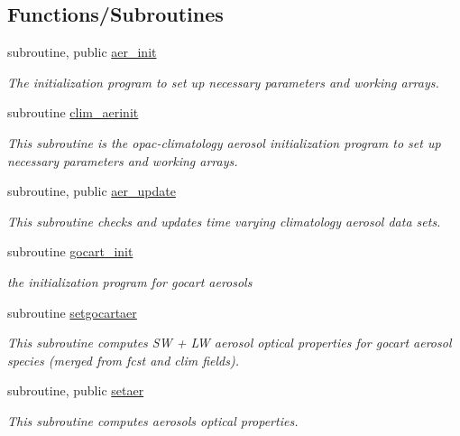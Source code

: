 \subsection*{Functions/\+Subroutines}
\begin{DoxyCompactItemize}
\item 
subroutine, public \hyperlink{group__module__radiation__aerosols_gabe52f1b6f62b158154e70a7b5058ad20}{aer\+\_\+init}
\begin{DoxyCompactList}\small\item\em The initialization program to set up necessary parameters and working arrays. \end{DoxyCompactList}\item 
subroutine \hyperlink{group__module__radiation__aerosols_ga0f5df46b558d8bd64f80161e83542222}{clim\+\_\+aerinit}
\begin{DoxyCompactList}\small\item\em This subroutine is the opac-\/climatology aerosol initialization program to set up necessary parameters and working arrays. \end{DoxyCompactList}\item 
subroutine, public \hyperlink{group__module__radiation__aerosols_ga1828b8076c7413903e66794b20ce1d37}{aer\+\_\+update}
\begin{DoxyCompactList}\small\item\em This subroutine checks and updates time varying climatology aerosol data sets. \end{DoxyCompactList}\item 
subroutine \hyperlink{group__module__radiation__aerosols_gaed41923d67caaf1174eaa4303afdc55d}{gocart\+\_\+init}
\begin{DoxyCompactList}\small\item\em the initialization program for gocart aerosols \end{DoxyCompactList}\item 
subroutine \hyperlink{group__module__radiation__aerosols_ga685dc5ac4b7da2a375800bef712cbb8b}{setgocartaer}
\begin{DoxyCompactList}\small\item\em This subroutine computes SW + LW aerosol optical properties for gocart aerosol species (merged from fcst and clim fields). \end{DoxyCompactList}\end{DoxyCompactItemize}
{\bf }\par
\begin{DoxyCompactItemize}
\item 
subroutine, public \hyperlink{group__module__radiation__aerosols_ga559549bedb091683f71a705a875222d8}{setaer}
\begin{DoxyCompactList}\small\item\em This subroutine computes aerosols optical properties. \end{DoxyCompactList}\end{DoxyCompactItemize}

